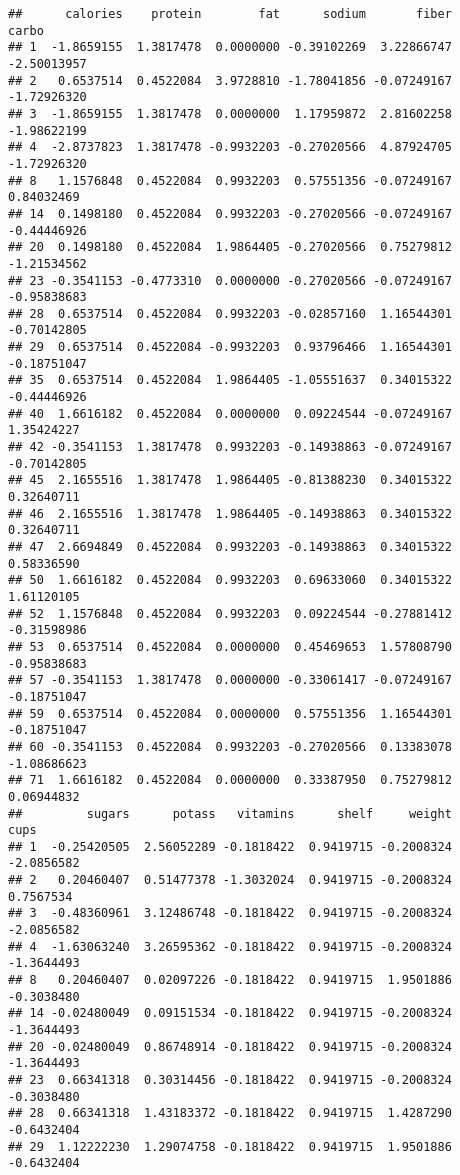 \documentclass[
]{article}
\begin{document}
\begin{verbatim}
##      calories    protein        fat      sodium       fiber       carbo
## 1  -1.8659155  1.3817478  0.0000000 -0.39102269  3.22866747 -2.50013957
## 2   0.6537514  0.4522084  3.9728810 -1.78041856 -0.07249167 -1.72926320
## 3  -1.8659155  1.3817478  0.0000000  1.17959872  2.81602258 -1.98622199
## 4  -2.8737823  1.3817478 -0.9932203 -0.27020566  4.87924705 -1.72926320
## 8   1.1576848  0.4522084  0.9932203  0.57551356 -0.07249167  0.84032469
## 14  0.1498180  0.4522084  0.9932203 -0.27020566 -0.07249167 -0.44446926
## 20  0.1498180  0.4522084  1.9864405 -0.27020566  0.75279812 -1.21534562
## 23 -0.3541153 -0.4773310  0.0000000 -0.27020566 -0.07249167 -0.95838683
## 28  0.6537514  0.4522084  0.9932203 -0.02857160  1.16544301 -0.70142805
## 29  0.6537514  0.4522084 -0.9932203  0.93796466  1.16544301 -0.18751047
## 35  0.6537514  0.4522084  1.9864405 -1.05551637  0.34015322 -0.44446926
## 40  1.6616182  0.4522084  0.0000000  0.09224544 -0.07249167  1.35424227
## 42 -0.3541153  1.3817478  0.9932203 -0.14938863 -0.07249167 -0.70142805
## 45  2.1655516  1.3817478  1.9864405 -0.81388230  0.34015322  0.32640711
## 46  2.1655516  1.3817478  1.9864405 -0.14938863  0.34015322  0.32640711
## 47  2.6694849  0.4522084  0.9932203 -0.14938863  0.34015322  0.58336590
## 50  1.6616182  0.4522084  0.9932203  0.69633060  0.34015322  1.61120105
## 52  1.1576848  0.4522084  0.9932203  0.09224544 -0.27881412 -0.31598986
## 53  0.6537514  0.4522084  0.0000000  0.45469653  1.57808790 -0.95838683
## 57 -0.3541153  1.3817478  0.0000000 -0.33061417 -0.07249167 -0.18751047
## 59  0.6537514  0.4522084  0.0000000  0.57551356  1.16544301 -0.18751047
## 60 -0.3541153  0.4522084  0.9932203 -0.27020566  0.13383078 -1.08686623
## 71  1.6616182  0.4522084  0.0000000  0.33387950  0.75279812  0.06944832
##         sugars      potass   vitamins      shelf     weight       cups
## 1  -0.25420505  2.56052289 -0.1818422  0.9419715 -0.2008324 -2.0856582
## 2   0.20460407  0.51477378 -1.3032024  0.9419715 -0.2008324  0.7567534
## 3  -0.48360961  3.12486748 -0.1818422  0.9419715 -0.2008324 -2.0856582
## 4  -1.63063240  3.26595362 -0.1818422  0.9419715 -0.2008324 -1.3644493
## 8   0.20460407  0.02097226 -0.1818422  0.9419715  1.9501886 -0.3038480
## 14 -0.02480049  0.09151534 -0.1818422  0.9419715 -0.2008324 -1.3644493
## 20 -0.02480049  0.86748914 -0.1818422  0.9419715 -0.2008324 -1.3644493
## 23  0.66341318  0.30314456 -0.1818422  0.9419715 -0.2008324 -0.3038480
## 28  0.66341318  1.43183372 -0.1818422  0.9419715  1.4287290 -0.6432404
## 29  1.12222230  1.29074758 -0.1818422  0.9419715  1.9501886 -0.6432404

\end{verbatim}
\end{document}
